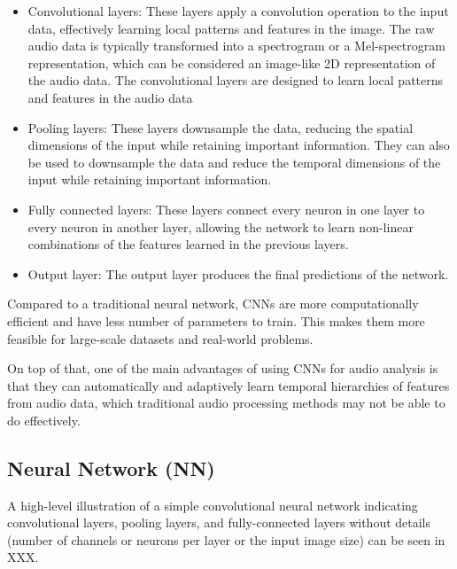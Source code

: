 \begin{itemize}

\item Convolutional layers: These layers apply a convolution operation to the input data, effectively learning local patterns and features in the image. The raw audio data is typically transformed into a spectrogram or a Mel-spectrogram representation, which can be considered an image-like 2D representation of the audio data. The convolutional layers are designed to learn local patterns and features in the audio data
\vspace*{3mm}

\item Pooling layers: These layers downsample the data, reducing the spatial dimensions of the input while retaining important information. They can also be used to downsample the data and reduce the temporal dimensions of the input while retaining important information. 
\vspace*{3mm}

\item Fully connected layers: These layers connect every neuron in one layer to every neuron in another layer, allowing the network to learn non-linear combinations of the features learned in the previous layers.
\vspace*{3mm}

\item Output layer: The output layer produces the final predictions of the network.
\end{itemize}

Compared to a traditional neural network, CNNs are more computationally efficient and have less number of parameters to train. This makes them more feasible for large-scale datasets and real-world problems.

On top of that, one of the main advantages of using CNNs for audio analysis is that they can automatically and adaptively learn temporal hierarchies of features from audio data, which traditional audio processing methods may not be able to do effectively. 

\subsection{Neural Network (NN)}






A high-level illustration of a simple convolutional neural network indicating convolutional layers, pooling layers, and fully-connected layers without details (number of channels or neurons per layer or the input image size) can be seen in XXX.








\newpage


